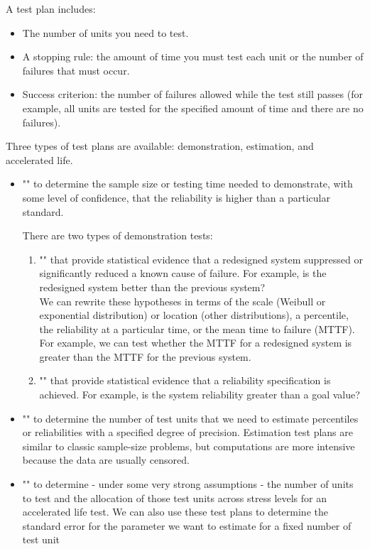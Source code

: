 	A test plan includes:
	\begin{itemize}
		\item The number of units you need to test.
		\item A stopping rule: the amount of time you must test each unit or the number of failures that must occur.
		\item Success criterion: the number of failures allowed while the test still passes (for example, all units are tested for the specified amount of time and there are no failures).
	\end{itemize}
	Three types of test plans are available: demonstration, estimation, and accelerated life.
	\begin{itemize}
		\item "" to determine the sample size or testing time needed to demonstrate, with some level of confidence, that the reliability is higher than a particular standard.

		There are two types of demonstration tests:
		\begin{enumerate}
			\item "" that provide statistical evidence that a redesigned system suppressed or significantly reduced a known cause of failure. For example, is the redesigned system better than the previous system?\\
			
			 We can rewrite these hypotheses in terms of the scale (Weibull or exponential distribution) or location (other distributions), a percentile, the reliability at a particular time, or the mean time to failure (MTTF). For example, we can test whether the MTTF for a redesigned system is greater than the MTTF for the previous system.\\

			\item "" that provide statistical evidence that a reliability specification is achieved. For example, is the system reliability greater than a goal value?
		\end{enumerate}

		\item "" to determine the number of test units that we need to estimate percentiles or reliabilities with a specified degree of precision. Estimation test plans are similar to classic sample-size problems, but computations are more intensive because the data are usually censored.

		\item "" to determine - under some very strong assumptions - the number of units to test and the allocation of those test units across stress levels for an accelerated life test. We can also use these test plans to determine the standard error for the parameter we want to estimate for a fixed number of test unit
	\end{itemize}
